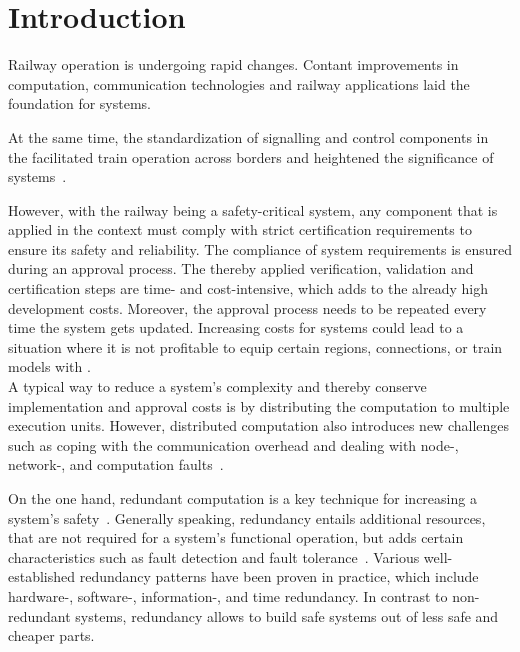 \chapter{Introduction}


Railway operation is undergoing rapid changes.
%
Contant improvements in computation, communication technologies and railway applications laid the foundation for  systems.

At the same time, the standardization of signalling and control components in the  facilitated train operation across borders and heightened the significance of  systems~\cite{YIN2017RNDofATO}.

However, with the railway being a safety-critical system, any component that is applied in the  context must comply with strict certification requirements to ensure its safety and reliability.
The compliance of system requirements is ensured during an approval process.
The thereby applied verification, validation and certification steps are time- and cost-intensive, which adds to the already high development costs.
Moreover, the approval process needs to be repeated every time the system gets updated.
Increasing costs for  systems could lead to a situation where it is not profitable to equip certain regions, connections, or train models with .
\\

A typical way to reduce a system's complexity and thereby conserve implementation and approval costs is by distributing the computation to multiple execution units.
However, distributed computation also introduces new challenges such as coping with the communication overhead and dealing with node-, network-, and computation faults~\cite{DistributedSafety2020}.

On the one hand, redundant computation is a key technique for increasing a system's safety~\cite{TanenbaumSteen07}.
Generally speaking, redundancy entails additional resources, that are not required for a system's functional operation, but adds certain characteristics such as fault detection and fault tolerance~\cite{BarryFaultToleranceAnalysis}.
Various well-established redundancy patterns have been proven in practice, which include hardware-, software-, information-, and time redundancy.
In contrast to non-redundant systems, redundancy allows to build safe systems out of less safe and cheaper parts.

